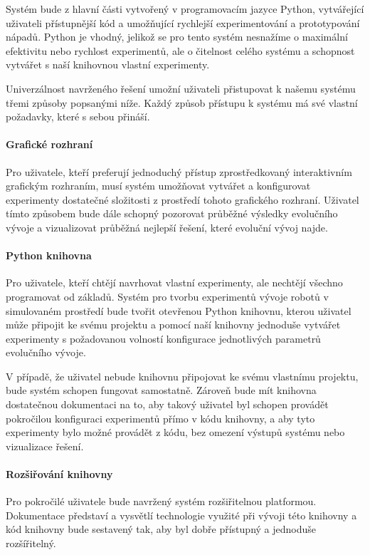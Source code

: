 Systém bude z hlavní části vytvořený v programovacím jazyce Python, vytvářející
uživateli přístupnější kód a umožňující rychlejší experimentování a
prototypování nápadů. Python je vhodný, jelikož se pro tento systém nesnažíme o
maximální efektivitu nebo rychlost experimentů, ale o čitelnost celého systému
a schopnost vytvářet s naší knihovnou vlastní experimenty.

Univerzálnost navrženého řešení umožní uživateli přistupovat k našemu systému
třemi způsoby popsanými níže. Každý způsob přístupu k systému má své vlastní
požadavky, které s sebou přináší. 

\paragraph{Grafické rozhraní}
Pro uživatele, kteří preferují jednoduchý přístup zprostředkovaný
interaktivním grafickým rozhraním, musí systém umožňovat vytvářet a
konfigurovat experimenty dostatečné složitosti z prostředí tohoto grafického
rozhraní. Uživatel tímto způsobem bude dále schopný pozorovat průběžné výsledky
evolučního vývoje a vizualizovat průběžná nejlepší řešení, které evoluční vývoj
najde.

\paragraph{Python knihovna}
Pro uživatele, kteří chtějí navrhovat vlastní experimenty, ale nechtějí všechno
programovat od základů. Systém pro tvorbu experimentů vývoje robotů v simulovaném prostředí bude tvořit
otevřenou Python knihovnu, kterou uživatel může připojit ke svému
projektu a pomocí naší knihovny jednoduše vytvářet experimenty s požadovanou
volností konfigurace jednotlivých parametrů evolučního vývoje.

V případě, že uživatel nebude knihovnu připojovat ke svému vlastnímu projektu,
bude systém schopen fungovat samostatně. Zároveň bude mít knihovna dostatečnou
dokumentaci na to, aby takový uživatel byl schopen provádět pokročilou
konfiguraci experimentů přímo v kódu knihovny, a aby tyto experimenty bylo
možné provádět z kódu, bez omezení výstupů systému nebo vizualizace řešení.

\paragraph{Rozšiřování knihovny}
Pro pokročilé uživatele bude navržený systém rozšiřitelnou platformou. Dokumentace
představí a vysvětlí technologie využité při vývoji této knihovny a kód
knihovny bude sestavený tak, aby byl dobře přístupný a jednoduše rozšířitelný.
